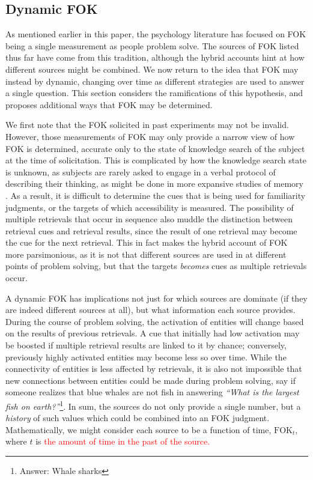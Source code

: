 \documentclass[10pt,letterpaper]{article}
\newcommand{\fixme}[2][]{#2}
\renewcommand{\fixme}[2][]{\textcolor{red}{#2}}
\newcommand{\fok}[0]{\text{FOK}}
\newcommand{\question}[2]{\emph{``#1''}\footnote{Answer: #2}}
\begin{document}


\subsection{Dynamic FOK}

As mentioned earlier in this paper, the psychology literature has focused on FOK being a single measurement as people problem solve.
The sources of FOK listed thus far have come from this tradition, although the hybrid accounts hint at how different sources might be combined. 
We now return to the idea that FOK may instead by dynamic, changing over time as different strategies are used to answer a single question.
This section considers the ramifications of this hypothesis, and proposes additional ways that FOK may be determined.

We first note that the FOK solicited in past experiments may not be invalid.
However, those measurements of FOK may only provide a narrow view of how FOK is determined, accurate only to the state of knowledge search of the subject at the time of solicitation.
This is complicated by how the knowledge search state is unknown, as subjects are rarely asked to engage in a verbal protocol of describing their thinking, as might be done in more expansive studies of memory \cite{Burgess1996ConfabulationAndThe}.
As a result, it is difficult to determine the cues that is being used for familiarity judgments, or the targets of which accessibility is measured.
The possibility of multiple retrievals that occur in sequence also muddle the distinction between retrieval cues and retrieval results, since the result of one retrieval may become the cue for the next retrieval.
This in fact makes the hybrid account of FOK more parsimonious, as it is not that different sources are used in at different points of problem solving, but that the targets \emph{becomes} cues as multiple retrievals occur.

A dynamic FOK has implications not just for which sources are dominate (if they are indeed different sources at all), but what information each source provides.
During the course of problem solving, the activation of entities will change based on the results of previous retrievals.
A cue that initially had low activation may be boosted if multiple retrieval results are linked to it by chance; conversely, previously highly activated entities may become less so over time.
While the connectivity of entities is less affected by retrievals, it is also not impossible that new connections between entities could be made during problem solving, say if someone realizes that blue whales are not fish in answering \question{What is the largest fish on earth?}{Whale sharks}.
In sum, the sources do not only provide a single number, but a \emph{history} of such values which could be combined into an FOK judgment.
Mathematically, we might consider each source to be a function of time, $\fok_t$, where $t$ is \fixme{the amount of time in the past of the source.}
\end{document}
